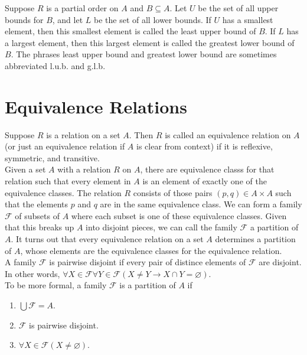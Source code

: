 \documentclass{article}
\begin{document}
\noindent Suppose $R$ is a partial order on $A$ and $B \subseteq A$. Let $U$ be the set of all upper bounds for $B$, and let $L$ be the set of all lower bounds. If $U$ has a smallest element, then this smallest element is called the \gls{least upper bound} of $B$. If $L$ has a largest element, then this largest element is called the \gls{greatest lower bound} of $B$. The phrases least upper bound and greatest lower bound are sometimes abbreviated l.u.b. and g.l.b.

\section{Equivalence Relations}
Suppose $R$ is a relation on a set $A$. Then $R$ is called an \gls{equivalence relation} on $A$ (or just an equivalence relation if $A$ is clear from context) if it is reflexive, symmetric, and transitive.\\

\noindent Given a set $A$ with a relation $R$ on $A$, there are \glspl{equivalence class} for that relation such that every element in $A$ is an element of exactly one of the equivalence classes. The relation $R$ consists of those pairs $(p, q) \in A \times A$ such that the elements $p$ and $q$ are in the same equivalence class. We can form a family $\mathcal{F}$ of subsets of $A$ where each subset is one of these equivalence classes. Given that this breaks up $A$ into disjoint pieces, we can call the family $\mathcal{F}$ a \gls{partition} of $A$. It turns out that every equivalence relation on a set $A$ determines a partition of $A$, whose elements are the equivalence classes for the equivalence relation.\\

\noindent A family $\mathcal{F}$ is \gls{pairwise disjoint} if every pair of distince elements of $\mathcal{F}$ are disjoint. In other words, $\forall X \in \mathcal{F} \forall Y \in \mathcal{F}(X \neq Y \rightarrow X \cap Y = \varnothing)$.\\

\noindent To be more formal, a family $\mathcal{F}$ is a partition of $A$ if
\begin{enumerate}
    \item $\bigcup \mathcal{F} = A$.
    \item $\mathcal{F}$ is pairwise disjoint.
    \item $\forall X \in \mathcal{F}(X \neq \varnothing)$.
\end{enumerate}
\end{document}
